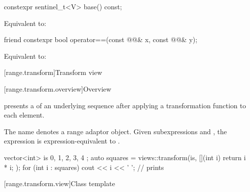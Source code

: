 %
\begin{itemdecl}
constexpr sentinel_t<V> base() const;
\end{itemdecl}

\begin{itemdescr}
\pnum
\effects
Equivalent to: 
\end{itemdescr}

%
\begin{itemdecl}
friend constexpr bool operator==(const @@& x, const @@& y);
\end{itemdecl}

\begin{itemdescr}
\pnum
\effects
Equivalent to: 
\end{itemdescr}

[range.transform]{Transform view}

[range.transform.overview]{Overview}

\pnum
{} presents
a  of an underlying sequence after
applying a transformation function to each element.

\pnum
{}%
The name  denotes a
range adaptor object.
Given subexpressions  and , the expression
 is expression-equivalent to
.

\pnum
\begin{example}
\begin{codeblock}
vector<int> is{ 0, 1, 2, 3, 4 };
auto squares = views::transform(is, [](int i) { return i * i; });
for (int i : squares)
  cout << i << ' '; // prints 
\end{codeblock}
\end{example}

[range.transform.view]{Class template }

